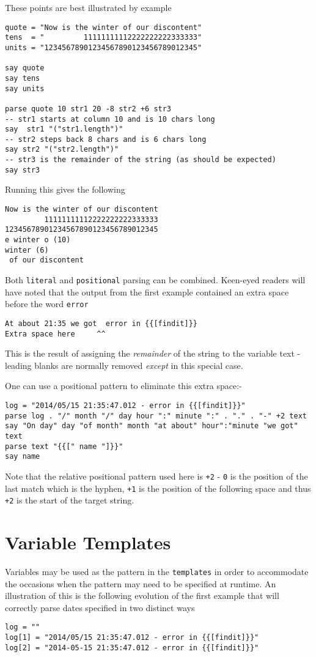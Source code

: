 {These points are best illustrated by example
\begin{lstlisting}[label=positionalParsing, caption=Positional Parsing]
quote = "Now is the winter of our discontent"
tens  = "         11111111112222222222333333"
units = "12345678901234567890123456789012345"

say quote
say tens
say units

parse quote 10 str1 20 -8 str2 +6 str3
-- str1 starts at column 10 and is 10 chars long
say  str1 "("str1.length")"
-- str2 steps back 8 chars and is 6 chars long
say str2 "("str2.length")"
-- str3 is the remainder of the string (as should be expected)
say str3
\end{lstlisting}
Running this gives the following
\begin{verbatim}
Now is the winter of our discontent 
         11111111112222222222333333 
12345678901234567890123456789012345 
e winter o (10) 
winter (6) 
 of our discontent 
\end{verbatim}

Both \texttt{literal} and \texttt{positional} parsing can be combined. Keen-eyed readers will have noted that the output from the first example contained an extra space before the word \texttt{error}
\begin{verbatim}
At about 21:35 we got  error in {{[findit]}} 
Extra space here     ^^
\end{verbatim}
This is the result of assigning the \textit{remainder} of the string to the variable text - leading blanks are normally removed \textit{except} in this special case.

One can use a positional pattern to eliminate this extra space:-
\begin{lstlisting}[label=combinedParsing, caption=Combined Parsing]
log = "2014/05/15 21:35:47.012 - error in {{[findit]}}"
parse log . "/" month "/" day hour ":" minute ":" . "." . "-" +2 text
say "On day" day "of month" month "at about" hour":"minute "we got" text
parse text "{{[" name "]}}"
say name
\end{lstlisting}

Note that the relative positional pattern used here is \texttt{+2} - \texttt{0} is the position of the last match which is the hyphen, \texttt{+1} is the position of the following space and thus \texttt{+2} is the start of the target string. 

\section{Variable Templates}
Variables may be used as the pattern in the \texttt{templates} in order to accommodate the occasions when the pattern may need to be specified at runtime. An illustration of this is the following evolution of the first example that will correctly parse dates specified in two distinct ways
\begin{lstlisting}[label=variablePattern, caption=Variables in Patterns]
log = ""
log[1] = "2014/05/15 21:35:47.012 - error in {{[findit]}}"
log[2] = "2014-05-15 21:35:47.012 - error in {{[findit]}}"


\end{lstlisting}}
